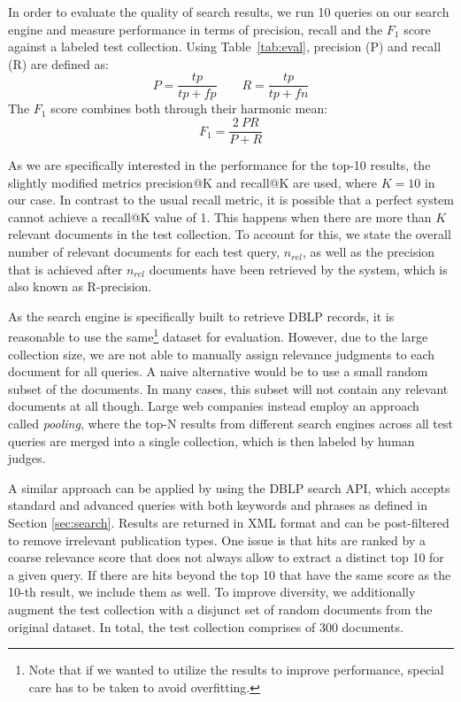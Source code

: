 \documentclass{sig-alternate-05-2015}
\begin{document}
In order to evaluate the quality of search results, we run 10 queries on our search engine and measure performance in terms of precision, recall and the $F_1$ score against a labeled test collection. Using Table~\ref{tab:eval}, precision (P) and recall (R) are defined as:
\begin{equation*}
P=\frac{tp}{tp+fp} \qquad R=\frac{tp}{tp+fn}
\end{equation*}
The $F_1$ score combines both through their harmonic mean: 
\begin{equation*}
F_1=\frac{2~PR}{P+R}
\end{equation*}

As we are specifically interested in the performance for the top-10 results, the slightly modified metrics precision@K and recall@K are used, where $K=10$ in our case. In contrast to the usual recall metric, it is possible that a perfect system cannot achieve a recall@K value of 1. This happens when there are more than $K$ relevant documents in the test collection. To account for this, we state the overall number of relevant documents for each test query, $n_{rel}$, as well as the precision that is achieved after $n_{rel}$ documents have been retrieved by the system, which is also known as R-precision.

As the search engine is specifically built to retrieve DBLP records, it is reasonable to use the same\footnote{Note that if we wanted to utilize the results to improve performance, special care has to be taken to avoid overfitting.} dataset for evaluation. However, due to the large collection size, we are not able to manually assign relevance judgments to each document for all queries. A naive alternative would be to use a small random subset of the documents. In many cases, this subset will not contain any relevant documents at all though. Large web companies instead employ an approach called \emph{pooling}, where the top-N results from different search engines across all test queries are merged into a single collection, which is then labeled by human judges.  

A similar approach can be applied by using the DBLP search API, which accepts standard and advanced queries with both keywords and phrases as defined in Section \ref{sec:search}. Results are returned in XML format and can be post-filtered to remove irrelevant publication types. One issue is that hits are ranked by a coarse relevance score that does not always allow to extract a distinct top 10 for a given query. If there are hits beyond the top 10 that have the same score as the 10-th result, we include them as well. To improve diversity, we additionally augment the test collection with a disjunct set of random documents from the original dataset. In total, the test collection comprises of 300 documents.
\end{document}
